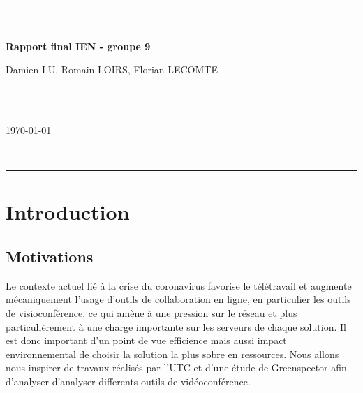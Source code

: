 \documentclass[11pt,a4paper]{report}
\begin{document}
\begin{titlepage}
\vspace*{\fill}
\hrule ~\vspace{0.5cm}

\begin{huge}
\noindent \textbf{Rapport final IEN - groupe 9}
\end{huge} 
\vspace{0.5cm}

\vspace{2cm}

\begin{Large}
\noindent Damien LU, Romain LOIRS, Florian LECOMTE
\end{Large} \\ \\
\begin{Large}
\today
\end{Large}
~\vspace{0.5cm}
\hrule
\vspace*{\fill}
\end{titlepage}

\tableofcontents

\newpage
\chapter*{Introduction}

\section{Motivations}
Le contexte actuel lié à la crise du coronavirus favorise le télétravail et augmente mécaniquement l'usage d'outils de collaboration en ligne, en particulier les outils de visioconférence, ce qui amène à une pression sur le réseau et plus particulièrement à une charge importante sur les serveurs de chaque solution. Il est donc important d'un point de vue efficience mais aussi impact environnemental de choisir la solution la plus sobre en ressources. Nous allons nous inspirer de travaux réalisés par l'UTC et d'une étude de Greenspector afin d'analyser d'analyser differents outils de vidéoconférence.
\end{document}
